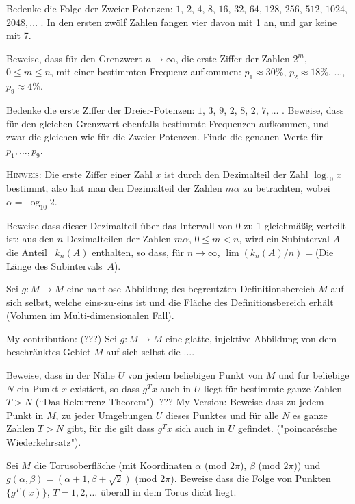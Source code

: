 \documentclass[12pt]{article} %
\begin{document}
\bigskip
{} Bedenke die Folge der Zweier-Potenzen: $1$, $2$, $4$, $8$, $16$, $32$, $64$, $128$, $256$, $512$, $1024$, $2048, \dots$ . In den ersten zwölf Zahlen fangen vier davon mit 1 an, und gar keine mit 7. 

Beweise, dass für den Grenzwert $n \to \infty$, die erste Ziffer der Zahlen $2^m$,
$0\leqslant m \leqslant n$, mit einer bestimmten Frequenz aufkommen: 
$p_1 \approx 30\%$, $p_2 \approx 18\%$, $\dots$, $p_9 \approx 4\%$.

\bigskip
{} Bedenke die erste Ziffer der Dreier-Potenzen: $1$,
$3$, $9$, $2$, $8$, $2$, $7, \dots$ . Beweise, dass für den gleichen Grenzwert ebenfalls bestimmte Frequenzen aufkommen, und zwar die gleichen wie für die Zweier-Potenzen. Finde die genauen Werte für $p_1, \dots, p_9$.

\medskip
\textsc{Hinweis:} Die erste Ziffer einer Zahl $x$ ist durch den Dezimalteil der Zahl 
$\log_{10} x$ bestimmt, also hat man den Dezimalteil der Zahlen $m \alpha$ zu betrachten, wobei $\alpha=\log_{10} 2$.

Beweise dass dieser Dezimalteil über das Intervall von 0 zu 1 gleichmäßig verteilt ist:  aus den $n$ Dezimalteilen der Zahlen $m \alpha$, $0 \leqslant m<n$, wird ein Subinterval $A$  die Anteil ~$k_n (A)$ enthalten, so dass, für $n \to \infty$,
$\lim (k_n (A)/n)={}$(Die Länge des Subintervals~$A$).
\pagebreak[3]

\bigskip
{} Sei $g\colon M \to M$ eine nahtlose Abbildung des begrentzten Definitionsbereich $M$ auf sich selbst, welche eins-zu-eins ist und die Fläche des Definitionsbereich erhält (Volumen im Multi-dimensionalen Fall).

My contribution: (???) Sei $g\colon M \to M$ eine glatte, injektive Abbildung von dem beschränktes Gebiet $M$ auf sich selbst die ....

Beweise, dass in der Nähe $U$ von jedem beliebigen Punkt von $M$ und für beliebige $N$ ein Punkt $x$ existiert, so dass $g^T x$ auch in $U$ liegt für bestimmte ganze Zahlen $T>N$ (``Das Rekurrenz-Theorem").
??? My Version:
Beweise dass zu jedem Punkt in $M$, zu jeder Umgebungen $U$ dieses Punktes und für alle $N$ es ganze Zahlen $T>N$ gibt, für die gilt dass $g^T x$ sich auch in $U$ gefindet. ("poincarésche Wiederkehrsatz").

\bigskip
{} Sei $M$ die Torusoberfläche (mit Koordinaten $\alpha$ (mod $2\pi$), $\beta$ (mod $2\pi$)) und $g(\alpha, \beta)=(\alpha+1, \beta+ \sqrt{2})$ (mod $2\pi$). Beweise dass die Folge von Punkten $\{g^T (x)\}$, $T=1, 2, \dots$ überall in dem Torus dicht liegt.
\end{document}
